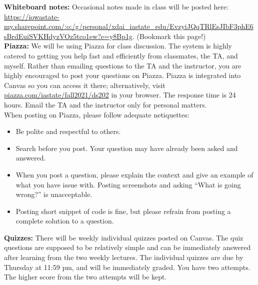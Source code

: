 \documentclass[10pt]{article}
\newcommand{\sep}{\vspace*{0.4cm}}
\begin{document}
\textbf{Whiteboard notes:} Occasional notes made in class will be posted here:  \url{https://iowastate-my.sharepoint.com/:o:/g/personal/xdai_iastate_edu/EvzyiJQqTRlEsJIbF3phE6sBrdEuiSVKHdyzVOz5tco1ew?e=y8Bp1g}. (Bookmark this page!) \\

\textbf{Piazza:} We will be using Piazza for class discussion. The system is highly catered to getting you help fast and efficiently from classmates, the TA, and myself. Rather than emailing questions to the TA and the instructor, you are highly encouraged to post your questions on Piazza. 
Piazza is integrated into Canvas so you can access it there; alternatively, visit \url{piazza.com/iastate/fall2021/ds202} in your browser.
The response time is 24 hours.
Email the TA and the instructor only for personal matters.
\\

When posting on Piazza, please follow adequate netiquettes:
\begin{itemize}
\setlength\itemsep{0pt}
\item Be polite and respectful to others.
\item Search before you post. Your question may have already been asked and answered. 
\item When you post a question, please explain the context and give an example of what you have issue with. 
Posting screenshots and asking ``What is going wrong?'' is unacceptable.
\item Posting short snippet of code is fine, but please refrain from posting a complete solution to a question.
\end{itemize}


\sep

\textbf{Quizzes:}
There will be weekly individual quizzes posted on Canvas. 
The quiz questions are supposed to be relatively simple and can be immediately answered after learning from the two weekly lectures.
The individual quizzes are due by Thursday at 11:59 pm, and will be immediately graded. 
You have two attempts. 
The higher score from the two attempts will be kept.
%
\sep
\end{document}

